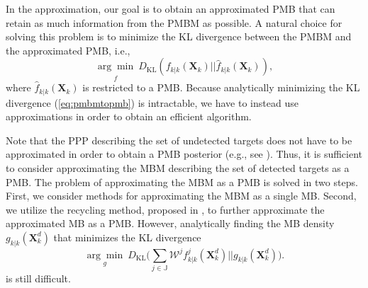 \documentclass[journal]{IEEEtran}
\begin{document}
In the approximation, our goal is to obtain an approximated PMB that can retain as much information from the PMBM as possible. A natural choice for solving this problem is to minimize the KL divergence between the PMBM and the approximated PMB, i.e.,
\begin{equation}
    \underset{\hat{f}}{\arg\min}~D_{\text{KL}}(f_{k|k}(\mathbf{X}_k)||\hat{f}_{k|k}(\mathbf{X}_k)),
    \label{eq:pmbmtopmb}
\end{equation}
where $\hat{f}_{k|k}(\mathbf{X}_k)$ is restricted to a PMB. Because analytically minimizing the KL divergence (\ref{eq:pmbmtopmb}) is intractable, we have to instead use approximations in order to obtain an efficient algorithm. 


Note that the PPP describing the set of undetected targets does not have to be approximated in order to obtain a PMB posterior (e.g., see \cite{recycle}). Thus, it is sufficient to consider approximating the MBM describing the set of detected targets as a PMB. The problem of approximating the MBM as a PMB is solved in two steps. First, we consider methods for approximating the MBM as a single MB. Second, we utilize the recycling method, proposed in \cite{recycle}, to further approximate the approximated MB as a PMB. However, analytically finding the MB density $g_{k|k}(\mathbf{X}_k^d)$ that minimizes the KL divergence
\begin{equation}
    \underset{g}{\arg\min}~D_{\text{KL}}\bigg(\sum_{j\in\mathbb{J}}\mathcal{W}^jf_{k|k}^j(\mathbf{X}_k^d)||g_{k|k}(\mathbf{X}_k^d)\bigg).
    \label{eq:mbmtomb}
\end{equation}
is still difficult. 

\end{document}
